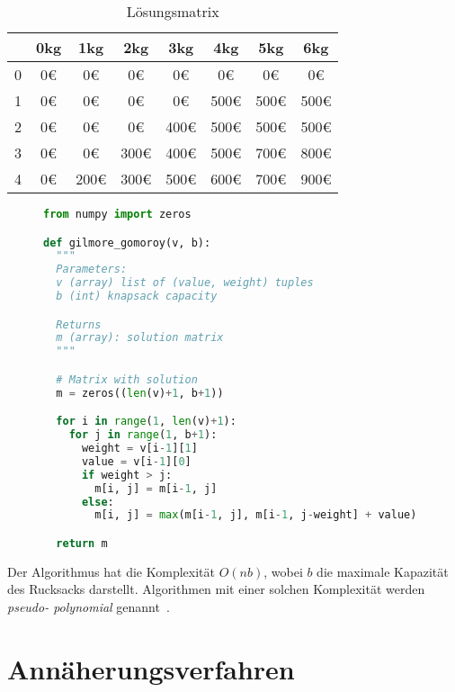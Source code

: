 \documentclass[12pt, a4paper, ngerman]{article}
\begin{document}
\begin{table}
  \renewcommand{\arraystretch}{1.2}
  \centering
  \begin{tabular}{c |c c c c c c c}
      & 0kg & 1kg  & 2kg  & 3kg  & 4kg  & 5kg  & 6kg  \\
    \hline
    0 & 0€  & 0€   & 0€   & 0€   & 0€   & 0€   & 0€   \\
    1 & 0€  & 0€   & 0€   & 0€   & 500€ & 500€ & 500€ \\
    2 & 0€  & 0€   & 0€   & 400€ & 500€ & 500€ & 500€ \\
    3 & 0€  & 0€   & 300€ & 400€ & 500€ & 700€ & 800€ \\
    4 & 0€  & 200€ & 300€ & 500€ & 600€ & 700€ & 900€
  \end{tabular}
  \caption{Lösungsmatrix}
  \label{tab:mat}
\end{table}

\begin{figure}
  \begin{lstlisting}[language=Python,style=light,caption={Gilmore Gomoroy in Python}, label={lst:dyn_opt}]
from numpy import zeros

def gilmore_gomoroy(v, b):
  """
  Parameters: 
  v (array) list of (value, weight) tuples
  b (int) knapsack capacity

  Returns
  m (array): solution matrix
  """

  # Matrix with solution
  m = zeros((len(v)+1, b+1))

  for i in range(1, len(v)+1):
    for j in range(1, b+1):
      weight = v[i-1][1]
      value = v[i-1][0]
      if weight > j:
        m[i, j] = m[i-1, j]
      else:
        m[i, j] = max(m[i-1, j], m[i-1, j-weight] + value)

  return m
\end{lstlisting}
\end{figure}

Der Algorithmus hat die Komplexität \(O(nb)\),
wobei \(b\) die maximale Kapazität des Rucksacks darstellt.
Algorithmen mit einer solchen Komplexität werden \emph{pseudo- polynomial} genannt~\cite{scheiterhauer2008}.


\section{Annäherungsverfahren}
\label{sec:approx}
\end{document}
